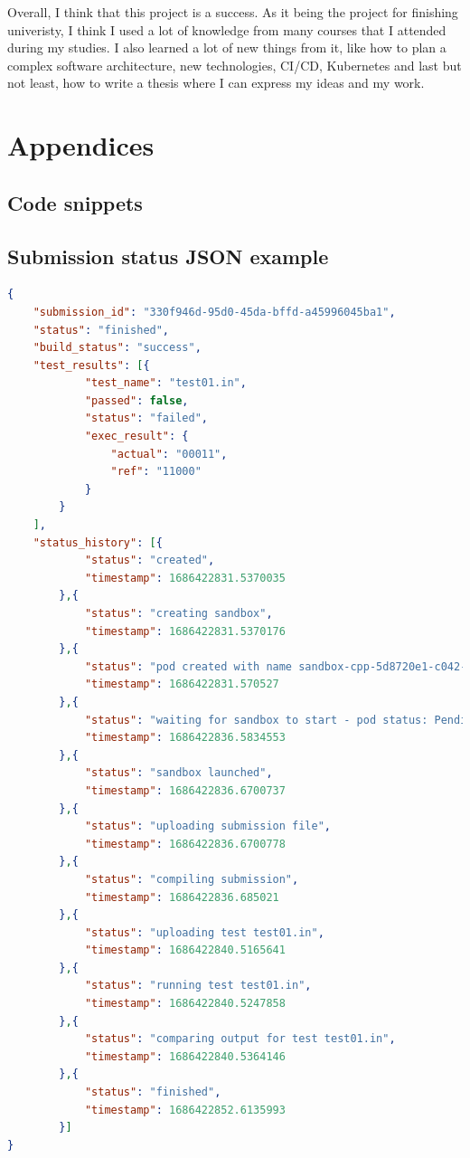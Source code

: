 \documentclass[12pt,a4paper]{report}
\begin{document}
Overall, I think that this project is a success. As it being the project for finishing univeristy, I think I used a lot of knowledge from many courses that I attended during my studies. I also learned a lot of new things from it, like how to plan a complex software architecture, new technologies, CI/CD, Kubernetes and last but not least, how to write a thesis where I can express my ideas and my work.


\chapter*{Appendices}
\begin{appendices}

\chapter{Code snippets}
\label{anexa:cod}
\section{Submission status JSON example}
\label{anexa:cod:json-submission}
\begin{lstlisting}[language=json,firstnumber=1]
{
	"submission_id": "330f946d-95d0-45da-bffd-a45996045ba1",
	"status": "finished",
	"build_status": "success",
	"test_results": [{
			"test_name": "test01.in",
			"passed": false,
			"status": "failed",
			"exec_result": {
				"actual": "00011",
				"ref": "11000"
			}
		}
	],
	"status_history": [{
			"status": "created",
			"timestamp": 1686422831.5370035
		},{
			"status": "creating sandbox",
			"timestamp": 1686422831.5370176
		},{
			"status": "pod created with name sandbox-cpp-5d8720e1-c042-43ea-a95a-e8e268c6f0be",
			"timestamp": 1686422831.570527
		},{
			"status": "waiting for sandbox to start - pod status: Pending",
			"timestamp": 1686422836.5834553
		},{
			"status": "sandbox launched",
			"timestamp": 1686422836.6700737
		},{
			"status": "uploading submission file",
			"timestamp": 1686422836.6700778
		},{
			"status": "compiling submission",
			"timestamp": 1686422836.685021
		},{
			"status": "uploading test test01.in",
			"timestamp": 1686422840.5165641
		},{
			"status": "running test test01.in",
			"timestamp": 1686422840.5247858
		},{
			"status": "comparing output for test test01.in",
			"timestamp": 1686422840.5364146
		},{
			"status": "finished",
			"timestamp": 1686422852.6135993
		}]
}
\end{lstlisting}


\end{appendices}
\end{document}
